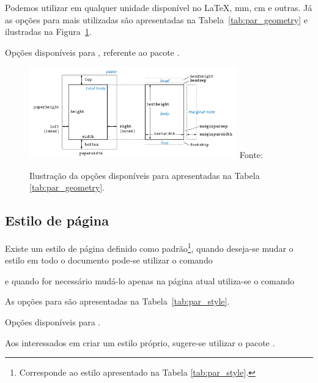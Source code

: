 Podemos utilizar  em qualquer unidade disponível no LaTeX, mm, cm
e outras. Já as opções para  mais utilizadas são apresentadas
na Tabela~\ref{tab:par_geometry} e ilustradas na Figura~\ref{fig:par_geometry}.
\begin{table}[h!tb]
  \centering
  \caption{Opções disponíveis para , referente ao pacote .}
  \label{tab:par_geometry}
  
\end{table}
\begin{figure}[h!]
  \centering
  \includegraphics[width=0.8\textwidth]{figures/geometry_margin.png}
  \flushright Fonte: \cite{Umeki:2010:Geometry}
  \caption{Ilustração da opções disponíveis para  apresentadas na Tabela \ref{tab:par_geometry}.} \label{fig:par_geometry}
\end{figure}

\subsection{Estilo de página}
Existe um estilo de página definido como padrão\footnote{Corresponde ao estilo
 apresentado na Tabela \ref{tab:par_style}.}, quando deseja-se
mudar o estilo em todo o documento pode-se utilizar o comando
\begin{code}
  \pagestyle{style}
\end{code}
e quando for necessário mudá-lo apenas na página atual utiliza-se o comando
\begin{code}
  \thispagestyle{style}
\end{code}

As opções para  são apresentadas na Tabela~\ref{tab:par_style}.
\begin{table}[htb]
  \centering
  \caption{Opções disponíveis para .}
  \label{tab:par_style}
  
\end{table}

Aos interessados em criar um estilo próprio, sugere-se utilizar o pacote
.
